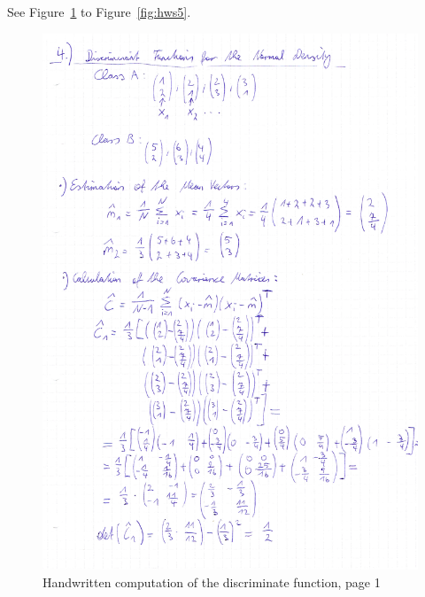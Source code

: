 \documentclass[subfigure,epsfig,fleqn,amssmb,float,caption,ausarbeitung]{scrartcl}
\begin{document}
See Figure~\ref{fig:hws1} to Figure~\ref{fig:hws5}.
\begin{figure}
\includegraphics[width=14cm]{img/discriminantFunction1.jpg}
	\caption{Handwritten computation of the discriminate function, page 1}
	\label{fig:hws1}
\end{figure}
\end{document}
